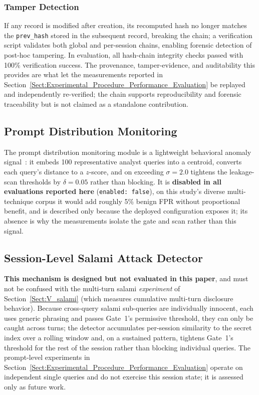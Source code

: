 \documentclass[journal]{IEEEtran}
\begin{document}
\subsubsection{Tamper Detection}

If any record is modified after creation, its recomputed hash no longer matches the \texttt{prev\_hash} stored in the subsequent record, breaking the chain; a verification script validates both global and per-session chains, enabling forensic detection of post-hoc tampering. In evaluation, all hash-chain integrity checks passed with 100\% verification success. The provenance, tamper-evidence, and auditability this provides are what let the measurements reported in Section~\ref{Sect:Experimental_Procedure_Performance_Evaluation} be replayed and independently re-verified; the chain supports reproducibility and forensic traceability but is not claimed as a standalone contribution.

\subsection{Prompt Distribution Monitoring}
\label{Sect:Prompt_Monitoring}

The prompt distribution monitoring module is a lightweight behavioral anomaly signal~\cite{nvidia_morpheus}: it embeds 100 representative analyst queries into a centroid, converts each query's distance to a $z$-score, and on exceeding $\sigma{=}2.0$ tightens the leakage-scan thresholds by $\delta{=}0.05$ rather than blocking. It is \textbf{disabled in all evaluations reported here} (\texttt{enabled: false}), on this study's diverse multi-technique corpus it would add roughly 5\% benign FPR without proportional benefit, and is described only because the deployed configuration exposes it; its absence is why the measurements isolate the gate and scan rather than this signal.

\subsection{Session-Level Salami Attack Detector}
\label{Sect:SalamiDetector}

\textbf{This mechanism is designed but not evaluated in this paper}, and must not be confused with the multi-turn salami \emph{experiment} of Section~\ref{Sect:V_salami} (which measures cumulative multi-turn disclosure behavior). Because cross-query salami sub-queries are individually innocent, each uses generic phrasing and passes Gate~1's permissive threshold, they can only be caught across turns; the detector accumulates per-session similarity to the secret index over a rolling window and, on a sustained pattern, tightens Gate~1's threshold for the rest of the session rather than blocking individual queries. The prompt-level experiments in Section~\ref{Sect:Experimental_Procedure_Performance_Evaluation} operate on independent single queries and do not exercise this session state; it is assessed only as future work.
\end{document}
